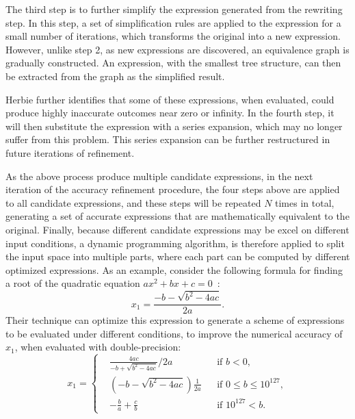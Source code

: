 The third step is to further simplify the expression generated from the
rewriting step.  In this step, a set of simplification rules are applied to the
expression for a small number of iterations, which transforms the original into
a new expression.  However, unlike step 2, as new expressions are discovered,
an equivalence graph is gradually constructed.  An expression, with the
smallest tree structure, can then be extracted from the graph as the simplified
result.

Herbie further identifies that some of these expressions, when evaluated,
could produce highly inaccurate outcomes near zero or infinity.  In the fourth
step, it will then substitute the expression with a series expansion, which
may no longer suffer from this problem.  This series expansion can be further
restructured in future iterations of refinement.

As the above process produce multiple candidate expressions, in the next
iteration of the accuracy refinement procedure, the four steps above are
applied to all candidate expressions, and these steps will be repeated
$N$ times in total, generating a set of accurate expressions that are
mathematically equivalent to the original.  Finally, because different
candidate expressions may be excel on different input conditions, a dynamic
programming algorithm, is therefore applied to split the input space into
multiple parts, where each part can be computed by different optimized
expressions.  As an example, consider the following formula for finding a root
of the quadratic equation $ax^2 + bx + c = 0$~\cite{panchekha15}:
\begin{equation}
    x_1 = \frac{-b - \sqrt{b^2 - 4ac}}{2a}.
\end{equation}
Their technique can optimize this expression to generate a scheme of
expressions to be evaluated under different conditions, to improve the
numerical accuracy of $x_1$, when evaluated with double-precision:
\begin{equation}
    x_1 = \left\{ \begin{aligned}
            & \frac{4ac}{-b + \sqrt{b^2 - 4ac}} / {2a} \qquad
                && \text{if~} b < 0, \\
            & \left( -b - \sqrt{b^2 - 4ac} \right) \frac{1}{2a}
                && \text{if~} 0 \leq b \leq 10^{127}, \\
            & - \frac{b}{a} + \frac{c}{b}
                && \text{if~} 10^{127} < b.
    \end{aligned} \right.
\end{equation}


